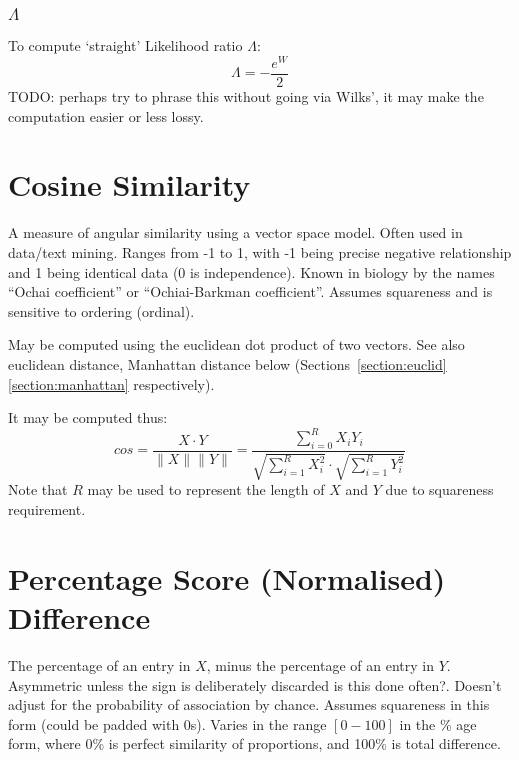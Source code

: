 \documentclass[11pt]{article}
\begin{document}
\subsubsection{$\Lambda$}
To compute `straight' Likelihood ratio $\Lambda$:
$$
\Lambda = - \frac{ e^W }{ 2 }
$$
TODO: perhaps try to phrase this without going via Wilks', it may make the computation easier or less lossy.
















\section{Cosine Similarity}
A measure of angular similarity using a vector space model.  Often used in data/text mining.  Ranges from -1 to 1, with -1 being precise negative relationship and 1 being identical data (0 is independence).  Known in biology by the names ``Ochai coefficient'' or ``Ochiai-Barkman coefficient''.  Assumes squareness and is sensitive to ordering (ordinal).

May be computed using the euclidean dot product of two vectors.  See also euclidean distance, Manhattan distance below (Sections~\ref{section:euclid}\ref{section:manhattan} respectively).

It may be computed thus:
$$
cos = \frac{ X \cdot Y }{ \|X\|\|Y\| } = \frac{  \sum_{i=0}^{R}{ X_iY_i }  }{     \sqrt{ \sum_{i=1}^{R}{X_i^2} }  \cdot  \sqrt{ \sum_{i=1}^{R}{Y_i^2} }    }
$$
Note that $R$ may be used to represent the length of $X$ and $Y$ due to squareness requirement.


















\section{Percentage Score (Normalised) Difference}
\label{section:percentage}
The percentage of an entry in $X$, minus the percentage of an entry in $Y$.  Asymmetric unless the sign is deliberately discarded {\color{red} is this done often?}.  Doesn't adjust for the probability of association by chance.  Assumes squareness in this form (could be padded with 0s).  Varies in the range $[0-100]$ in the \% age form, where 0\% is perfect similarity of proportions, and 100\% is total difference.
\end{document}
